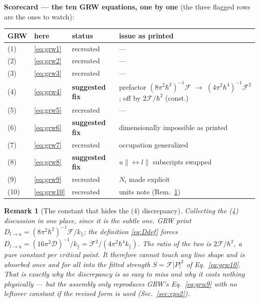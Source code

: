 \documentclass[11pt,a4paper]{article}
\numberwithin{equation}{section}
\newcommand{\cD}{\mathcal{D}}
\newcommand{\cF}{\mathcal{F}}
\newcommand{\kpar}{k_{\parallel}}
\newtheorem{remark}{Remark}[section]
\begin{document}
\medskip
\noindent\textbf{Scorecard --- the ten GRW equations, one by one}
(the three flagged rows are the ones to watch):
\begin{center}
\begin{tabular}{llll}
\toprule
GRW & here & status & issue as printed\\
\midrule
(1) & \eqref{eq:grw1} & recreated & ---\\
(2) & \eqref{eq:grw2} & recreated & ---\\
(3) & \eqref{eq:grw3} & recreated & ---\\
(4) & \eqref{eq:grw4} & \textbf{\textcolor{BrickRed}{suggested fix}} &
 prefactor $(8\pi^2\hbar^2)^{-1}\cF$ $\to$ $(4\pi^2\hbar^4)^{-1}\cF^2$;
 off by $2\cF/\hbar^2$ (const.)\\
(5) & \eqref{eq:grw5} & recreated & ---\\
(6) & \eqref{eq:grw6} & \textbf{\textcolor{BrickRed}{suggested fix}} & dimensionally impossible as printed\\
(7) & \eqref{eq:grw7} & recreated & occupation generalized\\
(8) & \eqref{eq:grw8} & \textbf{\textcolor{BrickRed}{suggested fix}} &
 $u\parallel\leftrightarrow l\parallel$ subscripts swapped\\
(9) & \eqref{eq:grw9} & recreated & $N_i$ made explicit\\
(10) & \eqref{eq:grw10} & recreated & units note (Rem.~\ref{rem:eq4})\\
\bottomrule
\end{tabular}
\end{center}

\begin{remark}[The constant that hides the (4) discrepancy]\label{rem:eq4}
Collecting the (4) discussion in one place, since it is the subtle
one. GRW print $D_{l\to u}=(8\pi^2\hbar^2)^{-1}\cF/\kpar$; the
definition \eqref{eq:Ddef} forces
$D_{l\to u}=(16\pi^2\cD)^{-1}/\kpar=\cF^2/(4\pi^2\hbar^4\kpar)$. The
ratio of the two is $2\cF/\hbar^2$, a pure constant per critical
point. It therefore cannot touch any line shape and is absorbed once
and for all into the fitted strength $S=\cF|P|^2$ of
Eq.~\eqref{eq:grw10}. That is exactly why the discrepancy is so easy
to miss and why it costs nothing physically --- but the assembly only
reproduces GRW's Eq.~\eqref{eq:grw9} with no leftover constant if the
revised form is used (Sec.~\ref{sec:eps2}).
\end{remark}

\appendix
\end{document}
